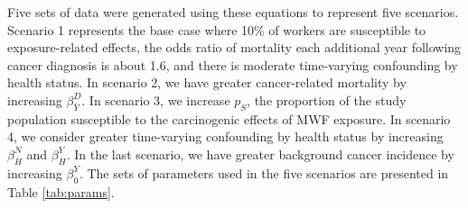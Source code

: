 \documentclass[
  11pt,
]{article}
\begin{document}
Five sets of data were generated using these equations to represent five
scenarios. Scenario 1 represents the base case where 10\% of workers are
susceptible to exposure-related effects, the odds ratio of mortality
each additional year following cancer diagnosis is about 1.6, and there
is moderate time-varying confounding by health status. In scenario 2, we
have greater cancer-related mortality by increasing
\(\beta_{\bar Y}^D\). In scenario 3, we increase \(p_S\), the proportion
of the study population susceptible to the carcinogenic effects of MWF
exposure. In scenario 4, we consider greater time-varying confounding by
health status by increasing \(\beta_H^N\) and \(\beta_H^Y\). In the last
scenario, we have greater background cancer incidence by increasing
\(\beta_0^Y\). The sets of parameters used in the five scenarios are
presented in Table \ref{tab:params}.
\end{document}
